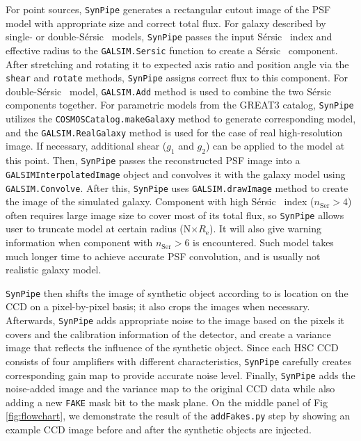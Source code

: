 \documentclass[useamsfonts]{pasj01}
\def\ser{{S\'{e}rsic\ }}
\def\synpipe{\texttt{SynPipe}}
\def\galsim{\texttt{G}{\scriptsize \texttt{AL}}\texttt{S}{\scriptsize \texttt{IM}}}
\begin{document}
    For point sources, \synpipe{} generates a rectangular cutout image of the PSF model
    with appropriate size and correct total flux.
    For galaxy described by single- or double-\ser{} models, \synpipe{} passes the input
    \ser{} index and effective radius to the \galsim{}\texttt{.Sersic} function to
    create a \ser{} component.
    After stretching and rotating it to expected axis ratio and position angle
    via the \texttt{shear} and \texttt{rotate} methods, \synpipe{} assigns correct flux
    to this component.
    For double-\ser{} model, \galsim{}\texttt{.Add} method is used to combine the two
    \ser{} components together.
    For parametric models from the GREAT3 catalog, \synpipe{} utilizes the
    \texttt{COSMOSCatalog.makeGalaxy} method to generate corresponding model,
    and the \galsim{}\texttt{.RealGalaxy} method is used for the case of real
    high-resolution image.
    If necessary, additional shear ($g_1$ and $g_2$) can be applied to the model at this
    point.
    Then, \synpipe{} passes the reconstructed PSF image into a
    \galsim{}\texttt{InterpolatedImage} object and convolves it with the galaxy model
    using \galsim{}\texttt{.Convolve}.
    After this, \synpipe{} uses \galsim{}\texttt{.drawImage} method to create the image
    of the simulated galaxy.
    Component with high \ser{} index ($n_{\mathrm{Ser}} > 4$) often requires large image
    size to cover most of its total flux, so \synpipe{} allows user to truncate model
    at certain radius (N$\times R_{\mathrm{e}}$).
    It will also give warning information when component with $n_{\mathrm{Ser}} > 6$ is
    encountered.
    Such model takes much longer time to achieve accurate PSF convolution, and is usually
    not realistic galaxy model.

    \synpipe{} then shifts the image of synthetic object according to is location on the
    CCD on a pixel-by-pixel basis; it also crops the images when necessary.
    Afterwards, \synpipe{} adds appropriate noise to the image based on the pixels it
    covers and the calibration information of the detector, and create a variance image
    that reflects the influence of the synthetic object.
    Since each HSC CCD consists of four amplifiers with different characteristics,
    \synpipe{} carefully creates corresponding gain map to provide accurate noise level.
    Finally, \synpipe{} adds the noise-added image and the variance map to the original
    CCD data while also adding a new \texttt{FAKE} mask bit to the mask plane.
    On the middle panel of Fig \ref{fig:flowchart}, we demonstrate the result of the
    \texttt{addFakes.py} step by showing an example CCD image before and after the
    synthetic objects are injected.
\end{document}
